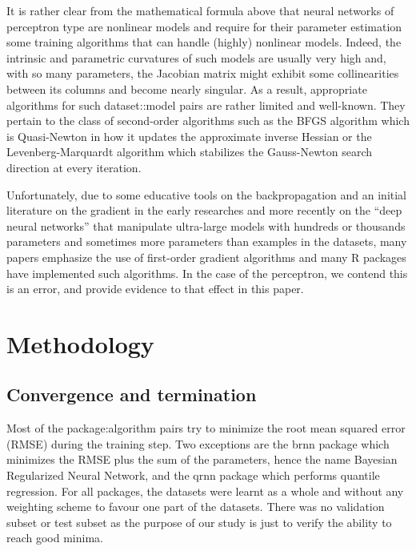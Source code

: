 It is rather clear from the mathematical formula above that neural
networks of perceptron type are nonlinear models and require for their
parameter estimation some training algorithms that can handle (highly)
nonlinear models. Indeed, the intrinsic and parametric curvatures of
such models are usually very high and, with so many parameters, the
Jacobian matrix might exhibit some collinearities between its columns
and become nearly singular. As a result, appropriate algorithms for such
dataset::model pairs are rather limited and well-known. They pertain to
the class of second-order algorithms such as the BFGS algorithm which is
Quasi-Newton in how it updates the approximate inverse Hessian or the
Levenberg-Marquardt algorithm which stabilizes the Gauss-Newton search
direction at every iteration.

Unfortunately, due to some educative tools on the backpropagation and an
initial literature on the gradient in the early researches and more
recently on the ``deep neural networks'' that manipulate ultra-large
models with hundreds or thousands parameters and sometimes more
parameters than examples in the datasets, many papers emphasize the use
of first-order gradient algorithms and many R packages have implemented
such algorithms. In the case of the perceptron, we contend this is an
error, and provide evidence to that effect in this paper.

\hypertarget{methodology}{%
\section{Methodology}\label{methodology}}

\hypertarget{convergence-and-termination}{%
\subsection{Convergence and
termination}\label{convergence-and-termination}}

Most of the package:algorithm pairs try to minimize the root mean
squared error (RMSE) during the training step. Two exceptions are the
brnn package which minimizes the RMSE plus the sum of the parameters,
hence the name Bayesian Regularized Neural Network, and the qrnn package
which performs quantile regression. For all packages, the datasets were
learnt as a whole and without any weighting scheme to favour one part of
the datasets. There was no validation subset or test subset as the
purpose of our study is just to verify the ability to reach good minima.

